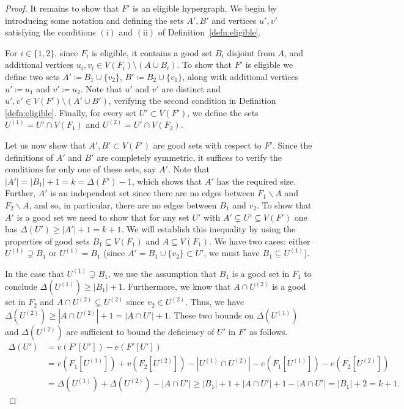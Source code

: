 \documentclass[11pt]{article}
\numberwithin{equation}{section}
\theoremstyle{plain}
\theoremstyle{remark}
\begin{document}
\begin{proof}
It remains to show that $F'$ is an eligible hypergraph. We begin by introducing some notation and defining the sets $A', B'$ and vertices $u', v'$ satisfying the conditions $\mathrm{(i)}$ and $\mathrm{(ii)}$ of Definition~\ref{defn:eligible}.

For $i\in \{1,2\}$, since $F_i$ is eligible, it contains a good set $B_i$ disjoint from $A$, and additional vertices $u_i, v_i \in V(F_i) \setminus (A\cup B_i)$. To show that $F'$ is eligible we define two sets $A' \coloneqq B_1\cup \{v_2\}$, $B'\coloneqq B_2\cup \{v_1\}$, along with additional vertices $u' \coloneqq u_1$ and $v' \coloneqq u_2$. Note that $u'$ and $v'$ are distinct and $u', v' \in V(F') \setminus (A' \cup B')$, verifying the second condition in Definition \ref{defn:eligible}. Finally, for every set $U'\subset V(F')$, we define the sets $U^{(1)}=U'\cap V(F_1)$ and $U^{(2)}=U'\cap V(F_2)$.

Let us now show that $A', B'\subset V(F')$ are good sets with respect to $F'$. Since the definitions of $A'$ and $B'$ are completely symmetric, it suffices to verify the conditions for only one of these sets, say $A'$. Note that $|A'|=|B_1|+1=k=\Delta(F')-1$, which shows that $A'$ has the required size. Further, $A'$ is an independent set since there are no edges between $F_1\backslash A$ and $F_2\backslash A$, and so, in particular, there are no edges between $B_1$ and $v_2$. To show that $A'$ is a good set we need to show that for any set $U'$ with $A'\subsetneq U'\subseteq V(F')$ one has $\Delta(U')\geq |A'|+1=k+1$. We will establish this inequality by using the properties of good sets $B_1\subseteq V(F_1)$ and $A\subseteq V(F_1)$. We have two cases: either $U^{(1)}\supsetneq B_1$ or $U^{(1)}=B_1$ (since $A'=B_1\cup \{v_2\}\subset U'$, we must have $B_1\subseteq U^{(1)}$). 

In the case that $U^{(1)}\supsetneq B_1$, we use the assumption that $B_1$ is a good set in $F_1$ to conclude $\Delta(U^{(1)})\geq |B_1|+1$. Furthermore, we know that $A\cap U^{(2)}$ is a good set in $F_2$ and $A\cap U^{(2)}\subsetneq U^{(2)}$ since $v_2\in U^{(2)}$. Thus, we have $\Delta(U^{(2)})\geq |A\cap U^{(2)}|+1 = |A\cap U'|+1$. These two bounds on $\Delta(U^{(1)})$ and $\Delta(U^{(2)})$ are sufficient to bound the deficiency of $U'$ in $F'$ as follows.
\begin{align*}
    \Delta(U')&=v(F'[U'])-e(F'[U']) \\ &=v(F_1[U^{(1)}])+v(F_2[U^{(2)}])-|U^{(1)}\cap U^{(2)}|-e(F_1[U^{(1)}])-e(F_2[U^{(2)}])\\
    &=\Delta(U^{(1)})+\Delta(U^{(2)})-|A\cap U'|\geq|B_1|+1+|A\cap U'|+1-|A\cap U'|=|B_1|+2=k+1.
\end{align*}


\end{proof}
\end{document}
